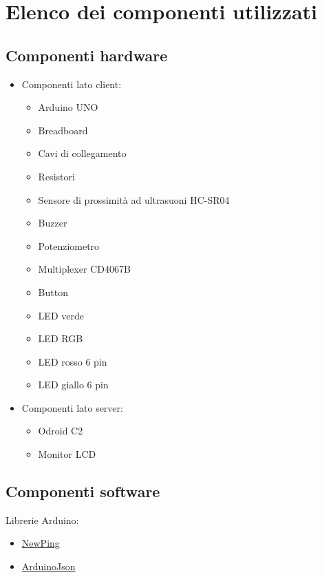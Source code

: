 \chapter{Elenco dei componenti utilizzati}

\section{Componenti hardware}
\begin{itemize}
	\item Componenti lato client:
	\begin{itemize}
		\item Arduino UNO
		\item Breadboard
		\item Cavi di collegamento
		\item Resistori
		\item Sensore di prossimità ad ultrasuoni HC-SR04
		\item Buzzer
		\item Potenziometro
		\item Multiplexer CD4067B
		\item Button
		\item LED verde
		\item LED RGB
		\item LED rosso 6 pin
		\item LED giallo 6 pin
	\end{itemize}
\end{itemize}

\begin{itemize}
	\item Componenti lato server:
	\begin{itemize}
		\item Odroid C2
		\item Monitor LCD
	\end{itemize}
\end{itemize}

\section{Componenti software}
Librerie Arduino:
\begin{itemize}
	\item \href{http://playground.arduino.cc/Code/NewPing}{NewPing}
	\item \href{https://github.com/bblanchon/ArduinoJson}{ArduinoJson} 
\end{itemize}

